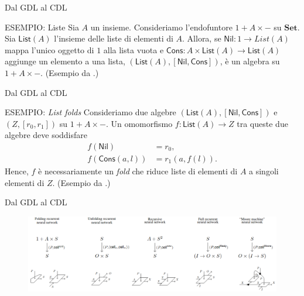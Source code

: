 \documentclass{beamer}
\begin{document}
\begin{frame}{Dal GDL al CDL}
    \begin{block}{ESEMPIO: Liste}
        Sia $A$ un insieme. Consideriamo l'endofuntore $1 + A \times -$ su $\mathbf{Set}$. Sia $\mathsf{List}(A)$ l'insieme delle liste di elementi di $A$. Allora, se $\mathsf{Nil}: 1 \to {List}(A)$ mappa l'unico oggetto di $1$ alla lista vuota e $\mathsf{Cons}: A \times \mathsf{List}(A) \to \mathsf{List}(A)$ aggiunge un elemento a una lista, $(\mathsf{List}(A), [\mathsf{Nil}, \mathsf{Cons}])$, è un algebra su $1 + A \times -$. (Esempio da \cite{gavranovicposition}.)
    \end{block}
\end{frame}

\begin{frame}{Dal GDL al CDL}
    \begin{block}{ESEMPIO: \textit{List folds}}
        Consideriamo due algebre $(\mathsf{List}(A), [\mathsf{Nil}, \mathsf{Cons}])$ e $(Z, [r_0,r_1])$ su $1 + A \times -$. Un omomorfismo $f: \mathsf{List}(A) \to Z$ tra queste due algebre deve soddisfare 
        \begin{align*}
            f(\mathsf{Nil}) &= r_0,\\
            f(\mathsf{Cons}(a,l)) &= r_1(a,f(l)). 
        \end{align*}
        Hence, $f$ è necessariamente un \textit{fold} che riduce liste di elementi di $A$ a singoli elementi di $Z$. (Esempio da \cite{gavranovicposition}.)
    \end{block}
\end{frame}

\begin{frame}{Dal GDL al CDL}
    \begin{figure}
        \begin{center}
            \includegraphics[width=1\textwidth]{figures/cells.png}
            \caption*{\cite{gavranovicposition}}
        \end{center}
    \end{figure}
\end{frame}
\end{document}
